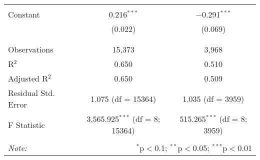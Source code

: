\begin{table}[!htbp]
\begin{tabular}{@{\extracolsep{5pt}}lcc}
  & & \\ 
 Constant & 0.216$^{***}$ & $-$0.291$^{***}$ \\ 
  & (0.022) & (0.069) \\ 
  & & \\ 
\hline \\[-1.8ex] 
Observations & 15,373 & 3,968 \\ 
R$^{2}$ & 0.650 & 0.510 \\ 
Adjusted R$^{2}$ & 0.650 & 0.509 \\ 
Residual Std. Error & 1.075 (df = 15364) & 1.035 (df = 3959) \\ 
F Statistic & 3,565.925$^{***}$ (df = 8; 15364) & 515.265$^{***}$ (df = 8; 3959) \\ 
\hline 
\hline \\[-1.8ex] 
\textit{Note:}  & \multicolumn{2}{r}{$^{*}$p$<$0.1; $^{**}$p$<$0.05; $^{***}$p$<$0.01} \\ 
\end{tabular} 
\end{table} 
